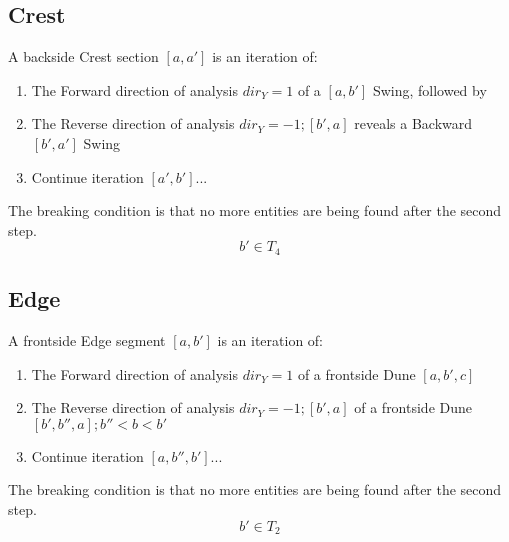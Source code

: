 \documentclass{report}
\begin{document}
\subsection{Crest}
A backside Crest section $[a,a']$ is an iteration of:
\begin{enumerate}
\item The Forward direction of analysis $dir_{Y}=1$ of a $[a,b']$ Swing, followed by 
\item The Reverse direction of analysis $dir_{Y}=-1;[b',a]$ reveals a Backward $[b',a']$ Swing
\item Continue iteration $[a',b']...$
\end{enumerate}
The breaking condition is that no more entities are being found after the second step.
\begin{equation}
b' \in T_{4}
\end{equation}

\subsection{Edge}
A frontside Edge segment $[a,b']$ is an iteration of:
\begin{enumerate}
\item The Forward direction of analysis $dir_{Y}=1$ of a frontside Dune $[a,b',c]$
\item The Reverse direction of analysis $dir_{Y}=-1;[b',a]$ of a frontside Dune $[b',b'',a]; b''<b<b'$ 
\item Continue iteration $[a,b'',b']...$
\end{enumerate}
The breaking condition is that no more entities are being found after the second step.
\begin{equation}
b' \in T_{2}
\end{equation}
\end{document}
